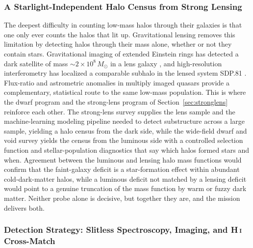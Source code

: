\documentclass[10pt,onecolumn]{article}
\begin{document}
\subsubsection{A Starlight-Independent Halo Census from Strong Lensing}

The deepest difficulty in counting low-mass halos through their galaxies is that one only ever counts the halos that lit up. Gravitational lensing removes this limitation by detecting halos through their mass alone, whether or not they contain stars. Gravitational imaging of extended Einstein rings has detected a dark satellite of mass $\sim2\times10^{8}\,M_\odot$ in a lens galaxy \cite{vegetti2012}, and high-resolution interferometry has localized a comparable subhalo in the lensed system SDP.81 \cite{hezaveh2016}. Flux-ratio and astrometric anomalies in multiply imaged quasars provide a complementary, statistical route to the same low-mass population. This is where the dwarf program and the strong-lens program of Section~\ref{sec:stronglens} reinforce each other. The strong-lens survey supplies the lens sample and the machine-learning modeling pipeline needed to detect substructure across a large sample, yielding a halo census from the dark side, while the wide-field dwarf and void survey yields the census from the luminous side with a controlled selection function and stellar-population diagnostics that say which halos formed stars and when. Agreement between the luminous and lensing halo mass functions would confirm that the faint-galaxy deficit is a star-formation effect within abundant cold-dark-matter halos, while a luminous deficit not matched by a lensing deficit would point to a genuine truncation of the mass function by warm or fuzzy dark matter. Neither probe alone is decisive, but together they are, and the mission delivers both.

\subsubsection{Detection Strategy: Slitless Spectroscopy, Imaging, and H\,\textsc{i} Cross-Match}
\end{document}

